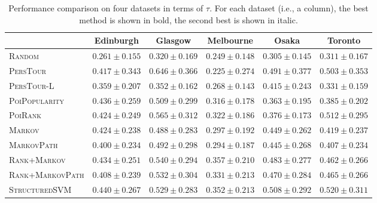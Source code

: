 \begin{table*}
\centering
\begin{tabular}{l|ccccc} \hline
 & Edinburgh & Glasgow & Melbourne & Osaka & Toronto \\ \hline
\textsc{Random} & $0.261\pm0.155$ & $0.320\pm0.169$ & $0.249\pm0.148$ & $0.305\pm0.145$ & $0.311\pm0.167$ \\
\textsc{PersTour}\cite{ijcai15} & $0.417\pm0.343$ & $\mathbf{0.646\pm0.366}$ & $0.225\pm0.274$ & $\mathit{0.491\pm0.377}$ & $0.503\pm0.353$ \\
\textsc{PersTour-L} & $0.359\pm0.207$ & $0.352\pm0.162$ & $0.268\pm0.143$ & $0.415\pm0.243$ & $0.331\pm0.159$ \\
\textsc{PoiPopularity} & $\mathit{0.436\pm0.259}$ & $0.509\pm0.299$ & $0.316\pm0.178$ & $0.363\pm0.195$ & $0.385\pm0.202$ \\
\textsc{PoiRank} & $0.424\pm0.249$ & $\mathit{0.565\pm0.312}$ & $0.322\pm0.186$ & $0.376\pm0.173$ & $\mathit{0.512\pm0.295}$ \\
\textsc{Markov} & $0.424\pm0.238$ & $0.488\pm0.283$ & $0.297\pm0.192$ & $0.449\pm0.262$ & $0.419\pm0.237$ \\
\textsc{MarkovPath} & $0.400\pm0.234$ & $0.492\pm0.298$ & $0.294\pm0.187$ & $0.445\pm0.268$ & $0.407\pm0.234$ \\
\textsc{Rank+Markov} & $0.434\pm0.251$ & $0.540\pm0.294$ & $\mathbf{0.357\pm0.210}$ & $0.483\pm0.277$ & $0.462\pm0.266$ \\
\textsc{Rank+MarkovPath} & $0.408\pm0.239$ & $0.532\pm0.304$ & $0.331\pm0.213$ & $0.470\pm0.284$ & $0.465\pm0.266$ \\
\textsc{StructuredSVM} & $\mathbf{0.440\pm0.267}$ & $0.529\pm0.283$ & $\mathit{0.352\pm0.213}$ & $\mathbf{0.508\pm0.292}$ & $\mathbf{0.520\pm0.311}$ \\
\hline
\end{tabular}
\caption{Performance comparison on four datasets in terms of $\tau$.
         For each dataset (i.e., a column), the best method is shown in bold, the second best is shown in italic.}
\label{table:tau}
\end{table*}





